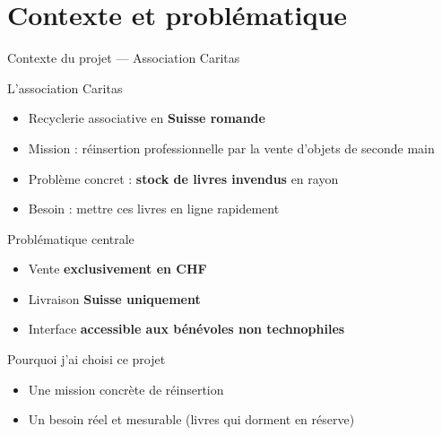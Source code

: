 \documentclass[aspectratio=169,10pt]{beamer}
\begin{document}
\section{Contexte et problématique}

\begin{frame}{Contexte du projet — Association Caritas}
  \begin{block}{L'association Caritas}
    \begin{itemize}
      \item Recyclerie associative en \textbf{Suisse romande}
      \item Mission : réinsertion professionnelle par la vente d'objets de seconde main
      \item Problème concret : \textbf{stock de livres invendus} en rayon
      \item Besoin : mettre ces livres en ligne rapidement
    \end{itemize}
  \end{block}
  \vspace{6pt}
  \begin{alertblock}{Problématique centrale}
    \begin{itemize}\small
      \item Vente \textbf{exclusivement en CHF}
      \item Livraison \textbf{Suisse uniquement}
      \item Interface \textbf{accessible aux bénévoles non technophiles}
    \end{itemize}
  \end{alertblock}
  \vspace{6pt}
  \begin{exampleblock}{\small Pourquoi j'ai choisi ce projet}
    \begin{itemize}\small
      \item Une mission concrète de réinsertion
      \item Un besoin réel et mesurable (livres qui dorment en réserve)
    \end{itemize}
  \end{exampleblock}
\end{frame}
\end{document}
